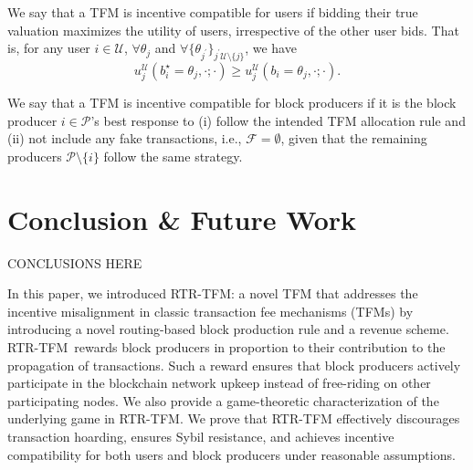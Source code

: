 \documentclass[sigconf,anonymous]{aamas}
\newcommand{\ourTFM}{\textsc{RTR-TFM}}
\begin{document}
\begin{definition}\label{def::UIC}
    We say that a TFM is incentive compatible for users if bidding their true valuation maximizes the utility of users, irrespective of the other user bids. That is, for any user $i \in \mathcal{U}$, $\forall \theta_j$ and $\forall \{\theta_{j^\prime}\}_{j^\prime \mathcal{U} \setminus \{j\} }$, we have
    $$
     u^\mathcal{U}_j(b_i^\star = \theta_j,\cdot; \cdot) \geq  u^\mathcal{U}_j(b_i = \theta_j,\cdot;\cdot).
    $$
\end{definition}

\begin{definition}\label{def::MIC}
    We say that a TFM is incentive compatible for block producers if it is the block producer $i \in \mathcal{P}$'s best response to (i) follow the intended TFM allocation rule and (ii) not include any fake transactions, i.e., $\mathcal{F}=\emptyset$, given that the remaining producers $\mathcal{P}\setminus \{i\}$ follow the same strategy. 
\end{definition}











\section{Conclusion \& Future Work}

CONCLUSIONS HERE

In this paper, we introduced \textsc{RTR-TFM}: a novel TFM that addresses the incentive misalignment in classic transaction fee mechanisms (TFMs) by introducing a novel routing-based block production rule and a revenue scheme. \ourTFM\ rewards block producers in proportion to their contribution to the propagation of transactions. Such a reward ensures that block producers actively participate in the blockchain network upkeep instead of free-riding on other participating nodes. We also provide a game-theoretic characterization of the underlying game in \ourTFM. We prove that \textsc{RTR-TFM} effectively discourages transaction hoarding, ensures Sybil resistance, and achieves incentive compatibility for both users and block producers under reasonable assumptions.
\end{document}
